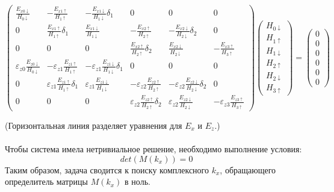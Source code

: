 \documentclass{article}
\begin{document}
$$
\begin{pmatrix}
\frac{E_{x0\downarrow}}{H_{0\downarrow}} & -\frac{E_{x1\uparrow}}{H_{1\uparrow}} & -\frac{E_{x1\downarrow}}{H_{1\downarrow}} \delta_1 & 0 & 0 & 0 \\
0 & \frac{E_{x1\uparrow}}{H_{1\uparrow}} \delta_1 & \frac{E_{x1\downarrow}}{H_{1\downarrow}} & -\frac{E_{x2\uparrow}}{H_{2\uparrow}} & -\frac{E_{x2\downarrow}}{H_{2\downarrow}} \delta_2 & 0 \\
0 & 0 & 0 & \frac{E_{x2\uparrow}}{H_{2\uparrow}} \delta_2 & \frac{E_{x2\downarrow}}{H_{2\downarrow}} & -\frac{E_{x3\uparrow}}{H_{3\uparrow}} \\ \hline
\varepsilon_{z0}\frac{E_{z0\downarrow}}{H_{0\downarrow}} & -\varepsilon_{z1}\frac{E_{z1\uparrow}}{H_{1\uparrow}} & -\varepsilon_{z1}\frac{E_{z1\downarrow}}{H_{1\downarrow}} \delta_1 & 0 & 0 & 0 \\
0 & \varepsilon_{z1} \frac{E_{z1\uparrow}}{H_{1\uparrow}} \delta_1 & \varepsilon_{z1} \frac{E_{z1\downarrow}}{H_{1\downarrow}} & -\varepsilon_{z2} \frac{E_{z2\uparrow}}{H_{2\uparrow}} & -\varepsilon_{z2} \frac{E_{z2\downarrow}}{H_{2\downarrow}} \delta_2 & 0 \\
0 & 0 & 0 & \varepsilon_{z2} \frac{E_{z2\uparrow}}{H_{2\uparrow}} \delta_2 & \varepsilon_{z2} \frac{E_{z2\downarrow}}{H_{2\downarrow}} & -\varepsilon_{z3} \frac{E_{z3\uparrow}}{H_{3\uparrow}}
\end{pmatrix}
\begin{pmatrix} H_{0\downarrow} \\ H_{1\uparrow} \\ H_{1\downarrow} \\ H_{2\uparrow} \\ H_{2\downarrow} \\ H_{3\uparrow} \end{pmatrix} = \begin{pmatrix} 0 \\ 0 \\ 0 \\ 0 \\ 0 \\ 0 \end{pmatrix}
$$

(Горизонтальная линия разделяет уравнения для $E_x$ и $E_z$.)
\\
\\
Чтобы система имела нетривиальное решение, необходимо выполнение условия:
$$
det(M(k_x))=0
$$
Таким образом, задача сводится к поиску комплексного $k_x$, обращающего определитель матрицы $M(k_x)$ в ноль.
\end{document}
